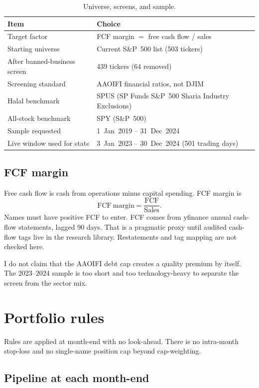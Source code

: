 \documentclass[11pt,letterpaper]{article}
\begin{document}
\begin{table}[htbp]
\centering
\caption{Universe, screens, and sample.}
\label{tab:universe}
\begin{tabular}{ll}
\toprule
Item & Choice \\
\midrule
Target factor & FCF margin $=$ free cash flow / sales \\
Starting universe & Current S\&P~500 list (503 tickers) \\
After banned-business screen & 439 tickers (64 removed) \\
Screening standard & AAOIFI financial ratios, not DJIM \\
Halal benchmark & SPUS (SP Funds S\&P~500 Sharia Industry Exclusions) \\
All-stock benchmark & SPY (S\&P~500) \\
Sample requested & 1~Jan~2019 -- 31~Dec~2024 \\
Live window used for stats & 3~Jan~2023 -- 30~Dec~2024 (501 trading days) \\
\bottomrule
\end{tabular}
\end{table}

\subsection{FCF margin}

Free cash flow is cash from operations minus capital spending. FCF margin is
\[
\mathrm{FCF\ margin} = \frac{\mathrm{FCF}}{\mathrm{Sales}}.
\]
Names must have positive FCF to enter. FCF comes from yfinance annual cash-flow statements, lagged 90 days. That is a pragmatic proxy until audited cash-flow tags live in the research library. Restatements and tag mapping are not checked here.

I do not claim that the AAOIFI debt cap creates a quality premium by itself. The 2023--2024 sample is too short and too technology-heavy to separate the screen from the sector mix.

\section{Portfolio rules}
\label{sec:rules}

Rules are applied at month-end with no look-ahead. There is no intra-month stop-loss and no single-name position cap beyond cap-weighting.

\subsection{Pipeline at each month-end}
\end{document}
